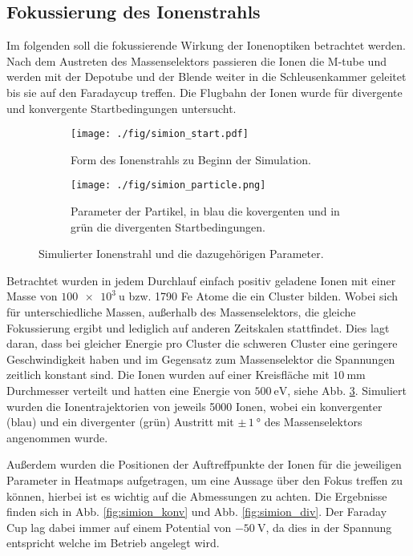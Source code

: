 \subsection{Fokussierung des Ionenstrahls}
\label{sec:fokus1}
Im folgenden soll die fokussierende Wirkung der Ionenoptiken betrachtet werden.
Nach dem Austreten des Massenselektors passieren die Ionen die M-tube und werden mit der Depotube und der Blende weiter in die Schleusenkammer geleitet bis sie auf den Faradaycup treffen.
Die Flugbahn der Ionen wurde für divergente und konvergente Startbedingungen untersucht.
\begin{figure}
  \centering
  \begin{subfigure}[h]{0.5\textwidth}
    \texttt{[image: ./fig/simion\_start.pdf]}
    \caption{Form des Ionenstrahls zu Beginn der Simulation.}
    \label{fig:strahlform}
  \end{subfigure}\hfill
  \begin{subfigure}[h]{0.475\textwidth}
    \texttt{[image: ./fig/simion\_particle.png]}
    \caption{Parameter der Partikel, in blau die kovergenten und in grün die divergenten Startbedingungen.}
    \label{fig:strahlparameter}
  \end{subfigure}
  \caption{Simulierter Ionenstrahl und die dazugehörigen Parameter.}
  \label{fig:simion_start}
\end{figure}
Betrachtet wurden in jedem Durchlauf einfach positiv geladene Ionen mit einer Masse von $\SI{100e3}{\amu}$ bzw. 1790 Fe Atome die ein Cluster bilden.
Wobei sich für unterschiedliche Massen, außerhalb des Massenselektors, die gleiche Fokussierung ergibt
und lediglich auf anderen Zeitskalen stattfindet.
Dies lagt daran, dass bei gleicher Energie pro Cluster die schweren Cluster eine geringere Geschwindigkeit haben und im Gegensatz zum Massenselektor die Spannungen zeitlich konstant sind.
Die Ionen wurden auf einer Kreisfläche mit $\SI{10}{\mm}$ Durchmesser verteilt und hatten eine Energie von $\SI{500}{\eV}$, siehe Abb. \ref{fig:simion_start}.
Simuliert wurden die Ionentrajektorien von jeweils 5000 Ionen, wobei ein konvergenter (blau) und ein divergenter (grün) Austritt mit $\pm\,\SI{1}{\degree}$ des Massenselektors angenommen wurde.




Außerdem wurden die Positionen der Auftreffpunkte der Ionen für die jeweiligen Parameter in Heatmaps aufgetragen, um eine Aussage über den Fokus treffen zu können, hierbei ist es wichtig auf die Abmessungen zu achten.
Die Ergebnisse finden sich in Abb. \ref{fig:simion_konv} und Abb. \ref{fig:simion_div}.
Der Faraday Cup lag dabei immer auf einem Potential von $\SI{-50}{\volt}$, da dies in der Spannung entspricht welche im Betrieb angelegt wird.\\

